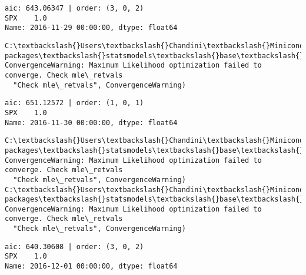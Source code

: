 \documentclass[11pt]{article}
\begin{document}
    \begin{Verbatim}[commandchars=\\\{\}]
aic: 643.06347 | order: (3, 0, 2)
SPX    1.0
Name: 2016-11-29 00:00:00, dtype: float64

    \end{Verbatim}

    \begin{Verbatim}[commandchars=\\\{\}]
C:\textbackslash{}Users\textbackslash{}Chandini\textbackslash{}Miniconda3\textbackslash{}envs\textbackslash{}auquan\textbackslash{}lib\textbackslash{}site-packages\textbackslash{}statsmodels\textbackslash{}base\textbackslash{}model.py:496: ConvergenceWarning: Maximum Likelihood optimization failed to converge. Check mle\_retvals
  "Check mle\_retvals", ConvergenceWarning)

    \end{Verbatim}

    \begin{Verbatim}[commandchars=\\\{\}]
aic: 651.12572 | order: (1, 0, 1)
SPX    1.0
Name: 2016-11-30 00:00:00, dtype: float64

    \end{Verbatim}

    \begin{Verbatim}[commandchars=\\\{\}]
C:\textbackslash{}Users\textbackslash{}Chandini\textbackslash{}Miniconda3\textbackslash{}envs\textbackslash{}auquan\textbackslash{}lib\textbackslash{}site-packages\textbackslash{}statsmodels\textbackslash{}base\textbackslash{}model.py:496: ConvergenceWarning: Maximum Likelihood optimization failed to converge. Check mle\_retvals
  "Check mle\_retvals", ConvergenceWarning)
C:\textbackslash{}Users\textbackslash{}Chandini\textbackslash{}Miniconda3\textbackslash{}envs\textbackslash{}auquan\textbackslash{}lib\textbackslash{}site-packages\textbackslash{}statsmodels\textbackslash{}base\textbackslash{}model.py:496: ConvergenceWarning: Maximum Likelihood optimization failed to converge. Check mle\_retvals
  "Check mle\_retvals", ConvergenceWarning)

    \end{Verbatim}

    \begin{Verbatim}[commandchars=\\\{\}]
aic: 640.30608 | order: (3, 0, 2)
SPX    1.0
Name: 2016-12-01 00:00:00, dtype: float64

    \end{Verbatim}
\end{document}
